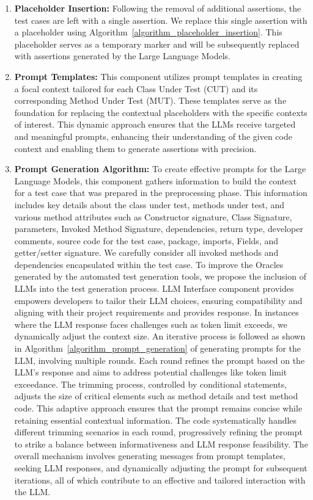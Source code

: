 \begin{enumerate}
\begin{enumerate}
        \item \textbf{Placeholder Insertion:} Following the removal of additional assertions, the test cases are left with a single assertion. We replace this single assertion with a placeholder using Algorithm~\ref{algorithm_placeholder_insertion}. This placeholder serves as a temporary marker and will be subsequently replaced with assertions generated by the Large Language Models.

        \item \textbf{Prompt Templates:} This component utilizes prompt templates in creating a focal context tailored for each Class Under Test (CUT) and its corresponding Method Under Test (MUT). These templates serve as the foundation for replacing the contextual placeholders with the specific contexts of interest. This dynamic approach ensures that the LLMs receive targeted and meaningful prompts, enhancing their understanding of the given code context and enabling them to generate assertions with precision.

        \item \textbf{Prompt Generation Algorithm:} To create effective prompts for the Large Language Models, this component gathers information to build the context for a test case that was prepared in the preprocessing phase. This information includes key details about the class under test, methods under test, and various method attributes such as Constructor signature, Class Signature, parameters, Invoked Method Signature, dependencies, return type, developer comments, source code for the test case, package, imports, Fields, and getter/setter signature. We carefully consider all invoked methods and dependencies encapsulated within the test case. To improve the Oracles generated by the automated test generation tools, we propose the inclusion of LLMs into the test generation process. LLM Interface component provides empowers developers to tailor their LLM choices, ensuring compatibility and aligning with their project requirements and provides response. In instances where the LLM response faces challenges such as token limit exceeds, we dynamically adjust the context size. An iterative process is followed as shown in Algorithm~\ref{algorithm_prompt_generation} of generating prompts for the LLM, involving multiple rounds. Each round refines the prompt based on the LLM's response and aims to address potential challenges like token limit exceedance. The trimming process, controlled by conditional statements, adjusts the size of critical elements such as method details and test method code. This adaptive approach ensures that the prompt remains concise while retaining essential contextual information. The code systematically handles different trimming scenarios in each round, progressively refining the prompt to strike a balance between informativeness and LLM response feasibility. The overall mechanism involves generating messages from prompt templates, seeking LLM responses, and dynamically adjusting the prompt for subsequent iterations, all of which contribute to an effective and tailored interaction with the LLM.


\end{enumerate}
\end{enumerate}
